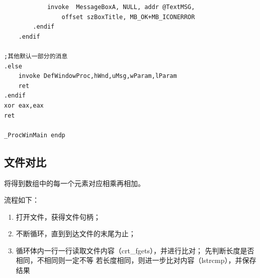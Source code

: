 \begin{lstlisting}
            invoke  MessageBoxA, NULL, addr @TextMSG,
                offset szBoxTitle, MB_OK+MB_ICONERROR
        .endif
    .endif 

;其他默认一部分的消息
.else
    invoke DefWindowProc,hWnd,uMsg,wParam,lParam
    ret
.endif
xor eax,eax
ret

_ProcWinMain endp    
\end{lstlisting}

\subsection{文件对比}
将得到数组中的每一个元素对应相乘再相加。

流程如下：
\begin{enumerate}
   \item 打开文件，获得文件句柄；
   \item 不断循环，直到到达文件的末尾为止；
   \item 循环体内一行一行读取文件内容（crt\_fgets），并进行比对；
   \iitem 先判断长度是否相同，不相同则一定不等
   \iitem 若长度相同，则进一步比对内容（lstrcmp），并保存结果 
\end{enumerate}


